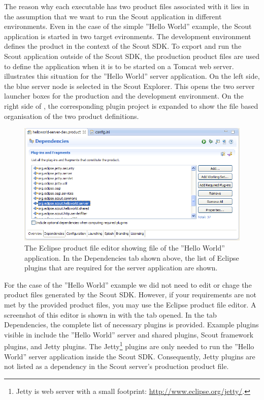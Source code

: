 \documentclass[a4paper,10pt,twoside]{book}
\begin{document}
The reason why each executable has two product files associated with it lies in the assumption that we want to run the Scout application in different environments.
Even in the case of the simple ''Hello World'' example, the Scout application is started in two target evironments.
The development environment defines the product in the context of the Scout SDK.
To export and run the Scout application outside of the Scout SDK, the production product files are used to define the application when it is to be started on a Tomcat web server.
 illustrates this situation for the ''Hello World'' server application. 
On the left side, the blue server node is selected in the Scout Explorer.
This opens the two server launcher boxes for the production and the development environment.
On the right side of , the corresponding plugin project  is expanded to show the file based organisation of the two product definitions.

\begin{figure}
\includegraphics[width=14cm]{sdk_server_dev_product.png} 
\caption{The Eclipse product file editor showing file  of the ''Hello World'' application.
In the Dependencies tab shown above, the list of Eclipse plugins that are required for the server application are shown.
}
\end{figure}

For the case of the ''Hello World'' example we did not need to edit or chage the product files generated by the Scout SDK. 
However, if your requirements are not met by the provided product files, you may use the Eclipse product file editor.
A screenshot of this editor is shown in  with the tab  opened.
In the tab Dependencies, the complete list of necessary plugins is provided.
Example plugins visible in  include the ''Hello World'' server and shared plugins, Scout framework plugins, and Jetty plugins.
The Jetty\footnote{
Jetty is web server with a small footprint: \url{http://www.eclipse.org/jetty/}.
} 
plugins are only needed to run the ''Hello World'' server application inside the Scout SDK.
Consequently, Jetty plugins are not listed as a dependency in the Scout server's production product file.
\end{document}
